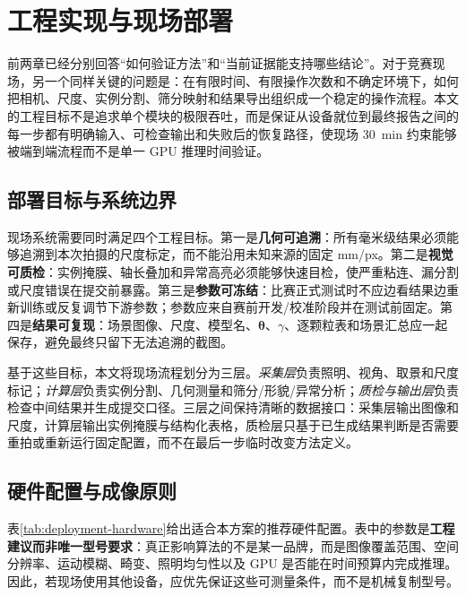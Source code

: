 \section{工程实现与现场部署}
\label{sec:deployment}

前两章已经分别回答“如何验证方法”和“当前证据能支持哪些结论”。对于竞赛现场，另一个同样关键的问题是：在有限时间、有限操作次数和不确定环境下，如何把相机、尺度、实例分割、筛分映射和结果导出组织成一个稳定的操作流程。本文的工程目标不是追求单个模块的极限吞吐，而是保证从设备就位到最终报告之间的每一步都有明确输入、可检查输出和失败后的恢复路径，使现场 30~min 约束能够被端到端流程而不是单一 GPU 推理时间验证。

\subsection{部署目标与系统边界}
\label{sec:deployment-goals}

现场系统需要同时满足四个工程目标。第一是\textbf{几何可追溯}：所有毫米级结果必须能够追溯到本次拍摄的尺度标定，而不能沿用未知来源的固定 mm/px。第二是\textbf{视觉可质检}：实例掩膜、轴长叠加和异常高亮必须能够快速目检，使严重粘连、漏分割或尺度错误在提交前暴露。第三是\textbf{参数可冻结}：比赛正式测试时不应边看结果边重新训练或反复调节下游参数；参数应来自赛前开发/校准阶段并在测试前固定。第四是\textbf{结果可复现}：场景图像、尺度、模型名、$\boldsymbol{\theta}$、$\gamma$、逐颗粒表和场景汇总应一起保存，避免最终只留下无法追溯的截图。

基于这些目标，本文将现场流程划分为三层。\emph{采集层}负责照明、视角、取景和尺度标记；\emph{计算层}负责实例分割、几何测量和筛分/形貌/异常分析；\emph{质检与输出层}负责检查中间结果并生成提交口径。三层之间保持清晰的数据接口：采集层输出图像和尺度，计算层输出实例掩膜与结构化表格，质检层只基于已生成结果判断是否需要重拍或重新运行固定配置，而不在最后一步临时改变方法定义。

\subsection{硬件配置与成像原则}
\label{sec:deployment-hardware}

表\ref{tab:deployment-hardware}给出适合本方案的推荐硬件配置。表中的参数是\textbf{工程建议而非唯一型号要求}：真正影响算法的不是某一品牌，而是图像覆盖范围、空间分辨率、运动模糊、畸变、照明均匀性以及 GPU 是否能在时间预算内完成推理。因此，若现场使用其他设备，应优先保证这些可测量条件，而不是机械复制型号。

